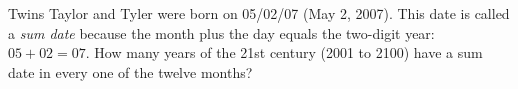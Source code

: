 Twins Taylor and Tyler were born on 05/02/07 (May 2, 2007). This date is called a \emph{sum date} because the month plus the day equals the two-digit year: $05+02=07$. How many years of the 21st century (2001 to 2100) have a sum date in every one of the twelve months?
